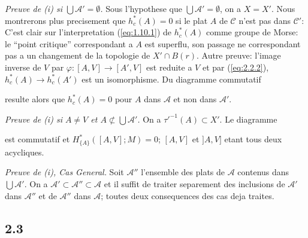 \documentclass[11pt,a4paper]{article}
\theoremstyle{plain}
\theoremstyle{definition}
\newcommand{\ori}{\operatorname{or}}
\begin{document}
\noindent\textit{Preuve de (i) si $\bigcup\mathcal{A}' = \emptyset$.} Sous l'hypothese que $\bigcup\mathcal{A}' = \emptyset$, on a $X = X'$.
Nous montrerons plus precisement que $h^*_c(A) = 0$ si le plat $A$ de $\mathcal{C}$ n'est pas dans $\mathcal{C}'$: C'est clair sur l'interpretation (\ref{eq:1.10.1}) de $h^*_c(A)$ comme groupe de Morse: le ``point critique'' correspondant a $A$ est superflu, son passage ne correspondant pas a un changement de la topologie de $X' \cap B(r)$. Autre preuve: l'image inverse de $V$ par $\varphi: [A,V] \to [A',V]$ est reduite a $V$ et par (\ref{eq:2.2.2}), $h^*_c(A) \to h^*_c(A')$ est un isomorphisme. Du diagramme commutatif
resulte alors que $h^*_c(A) = 0$ pour $A$ dans $\mathcal{A}$ et non dans $\mathcal{A}'$.

\noindent\textit{Preuve de (i) si $A \neq V$ et $A \not\subset \bigcup\mathcal{A}'$.} On a $\tau'^{-1}(A) \subset X'$. Le diagramme
est commutatif et $H^*_{\{A\}}([A,V];M) = 0$; $[A,V]$ et $]A,V]$ etant tous deux acycliques.

\noindent\textit{Preuve de (i), Cas General.} Soit $\mathcal{A}''$ l'ensemble des plats de $\mathcal{A}$ contenus dans $\bigcup\mathcal{A}'$. On a $\mathcal{A}' \subset \mathcal{A}'' \subset \mathcal{A}$ et il suffit de traiter separement des inclusions de $\mathcal{A}'$ dans $\mathcal{A}''$ et de $\mathcal{A}''$ dans $\mathcal{A}$; toutes deux consequences des cas deja traites.

\subsection{2.3}\label{subsec:2.3}
\end{document}
